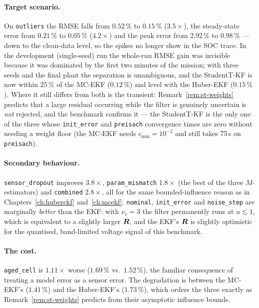 \paragraph{Target scenario.}  On \texttt{outliers} the RMSE falls from $0.52\,\%$ to $0.15\,\%$
($3.5\times$), the steady-state error from $0.21\,\%$ to $0.05\,\%$ ($4.2\times$) and the peak
error from $2.92\,\%$ to $0.98\,\%$ --- down to the clean-data level, so the spikes no longer show
in the SOC trace.  In the development (single-seed) run the whole-run RMSE gain was invisible
because it was dominated by the first two minutes of the mission; with three seeds and the final
plant the separation is unambiguous, and the StudentT-KF is now within $25\,\%$ of the MC-EKF
($0.12\,\%$) and level with the Huber-EKF ($0.15\,\%$).  Where it still differs from both is the
transient: Remark~\ref{rem:st-weights} predicts that a large residual occurring while the filter is
genuinely uncertain is \emph{not} rejected, and the benchmark confirms it --- the StudentT-KF is the
only one of the three whose \texttt{init\_error} and \texttt{preisach} convergence times are zero
without needing a weight floor (the MC-EKF needs $c_{\min}=10^{-2}$ and still takes 75\,s on
\texttt{preisach}).

\paragraph{Secondary behaviour.}  \texttt{sensor\_dropout} improves $3.8\times$,
\texttt{param\_mismatch} $1.8\times$ (the best of the three $M$-estimators) and \texttt{combined}
$2.8\times$, all for the same bounded-influence reason as in Chapters~\ref{ch:huberekf}
and~\ref{ch:mcekf}.  \texttt{nominal}, \texttt{init\_error} and \texttt{noise\_step} are marginally
\emph{better} than the EKF: with $\nu_v=3$ the filter permanently runs at $u\lesssim1$, which is
equivalent to a slightly larger $\bm{R}$, and the EKF's $\bm{R}$ is slightly optimistic for the
quantised, band-limited voltage signal of this benchmark.

\paragraph{The cost.}  \texttt{aged\_cell} is $1.11\times$ worse ($1.69\,\%$ vs.\ $1.52\,\%$), the
familiar consequence of treating a model error as a sensor error.  The degradation is between the
MC-EKF's ($1.41\,\%$) and the Huber-EKF's ($1.73\,\%$), which orders the three exactly as
Remark~\ref{rem:st-weights} predicts from their asymptotic influence bounds.

